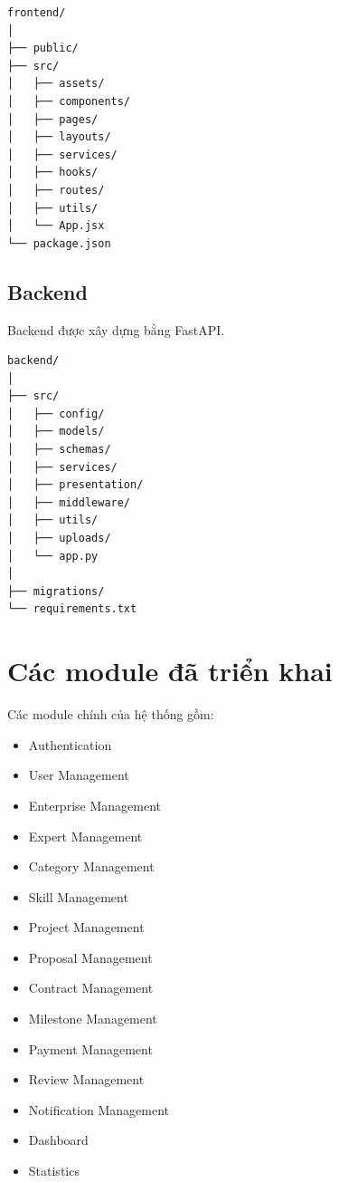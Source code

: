 \begin{lstlisting}
frontend/
│
├── public/
├── src/
│   ├── assets/
│   ├── components/
│   ├── pages/
│   ├── layouts/
│   ├── services/
│   ├── hooks/
│   ├── routes/
│   ├── utils/
│   └── App.jsx
└── package.json
\end{lstlisting}

\subsection{Backend}

Backend được xây dựng bằng FastAPI.

\begin{lstlisting}
backend/
│
├── src/
│   ├── config/
│   ├── models/
│   ├── schemas/
│   ├── services/
│   ├── presentation/
│   ├── middleware/
│   ├── utils/
│   ├── uploads/
│   └── app.py
│
├── migrations/
└── requirements.txt
\end{lstlisting}


\section{Các module đã triển khai}

Các module chính của hệ thống gồm:

\begin{itemize}

\item Authentication

\item User Management

\item Enterprise Management

\item Expert Management

\item Category Management

\item Skill Management

\item Project Management

\item Proposal Management

\item Contract Management

\item Milestone Management

\item Payment Management

\item Review Management

\item Notification Management

\item Dashboard

\item Statistics

\end{itemize}

